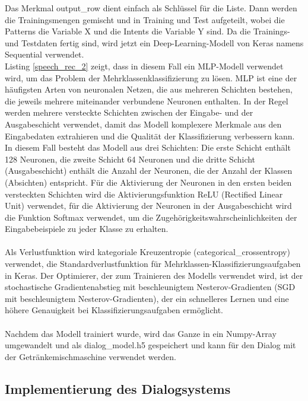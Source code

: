 Das Merkmal output\_row dient einfach als Schlüssel für die Liste. 
Dann werden die Trainingsmengen gemischt und in Training und Test aufgeteilt, wobei die Patterns die Variable X und die Intents die Variable Y sind. 
Da die Trainings- und Testdaten fertig sind, wird jetzt ein Deep-Learning-Modell von Keras namens Sequential verwendet.\\

Listing \ref{speech_rec_2} zeigt, dass in diesem Fall ein \ac{MLP}-Modell verwendet wird, um das Problem der Mehrklassenklassifizierung zu lösen. 
\ac{MLP} ist eine der häufigsten Arten von neuronalen Netzen, die aus mehreren Schichten bestehen, die jeweils mehrere miteinander verbundene Neuronen enthalten. 
In der Regel werden mehrere versteckte Schichten zwischen der Eingabe- und der Ausgabeschicht verwendet, damit das Modell komplexere Merkmale aus den Eingabedaten extrahieren und die Qualität der Klassifizierung verbessern kann. 
In diesem Fall besteht das Modell aus drei Schichten: Die erste Schicht enthält 128 Neuronen, die zweite Schicht 64 Neuronen und die dritte Schicht (Ausgabeschicht) enthält die Anzahl der Neuronen, die der Anzahl der Klassen (Absichten) entspricht. 
Für die Aktivierung der Neuronen in den ersten beiden versteckten Schichten wird die Aktivierungsfunktion ReLU (Rectified Linear Unit) verwendet, für die Aktivierung der Neuronen in der Ausgabeschicht wird die Funktion Softmax verwendet, um die Zugehörigkeitswahrscheinlichkeiten der Eingabebeispiele zu jeder Klasse zu erhalten.\\\\
Als Verlustfunktion wird kategoriale Kreuzentropie (categorical\_crossentropy) verwendet, die Standardverlustfunktion für Mehrklassen-Klassifizierungsaufgaben in Keras. 
Der Optimierer, der zum Trainieren des Modells verwendet wird, ist der stochastische Gradientenabstieg mit beschleunigtem Nesterov-Gradienten (SGD mit beschleunigtem Nesterov-Gradienten), der ein schnelleres Lernen und eine höhere Genauigkeit bei Klassifizierungsaufgaben ermöglicht.\\\\
Nachdem das Modell trainiert wurde, wird das Ganze in ein Numpy-Array umgewandelt und als dialog\_model.h5 gespeichert und kann für den Dialog mit der Getränkemischmaschine verwendet werden.
\subsection{Implementierung des Dialogsystems}
